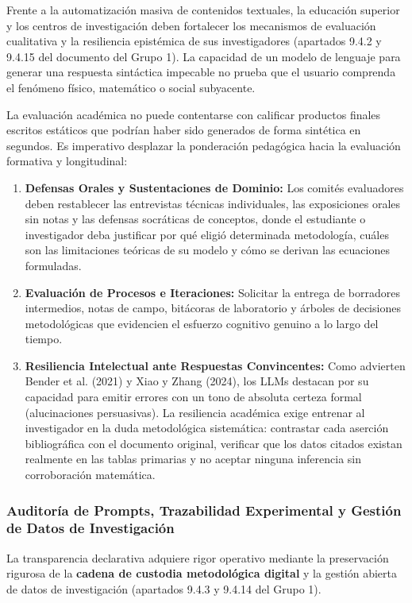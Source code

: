 Frente a la automatización masiva de contenidos textuales, la educación superior y los centros de investigación deben fortalecer los mecanismos de evaluación cualitativa y la resiliencia epistémica de sus investigadores (apartados 9.4.2 y 9.4.15 del documento del Grupo 1). La capacidad de un modelo de lenguaje para generar una respuesta sintáctica impecable no prueba que el usuario comprenda el fenómeno físico, matemático o social subyacente.

La evaluación académica no puede contentarse con calificar productos finales escritos estáticos que podrían haber sido generados de forma sintética en segundos. Es imperativo desplazar la ponderación pedagógica hacia la evaluación formativa y longitudinal:
\begin{enumerate}
    \item \textbf{Defensas Orales y Sustentaciones de Dominio:} Los comités evaluadores deben restablecer las entrevistas técnicas individuales, las exposiciones orales sin notas y las defensas socráticas de conceptos, donde el estudiante o investigador deba justificar por qué eligió determinada metodología, cuáles son las limitaciones teóricas de su modelo y cómo se derivan las ecuaciones formuladas.
    \item \textbf{Evaluación de Procesos e Iteraciones:} Solicitar la entrega de borradores intermedios, notas de campo, bitácoras de laboratorio y árboles de decisiones metodológicas que evidencien el esfuerzo cognitivo genuino a lo largo del tiempo.
    \item \textbf{Resiliencia Intelectual ante Respuestas Convincentes:} Como advierten Bender et al. (2021) y Xiao y Zhang (2024), los LLMs destacan por su capacidad para emitir errores con un tono de absoluta certeza formal (alucinaciones persuasivas). La resiliencia académica exige entrenar al investigador en la duda metodológica sistemática: contrastar cada aserción bibliográfica con el documento original, verificar que los datos citados existan realmente en las tablas primarias y no aceptar ninguna inferencia sin corroboración matemática.
\end{enumerate}

\subsubsection{Auditoría de Prompts, Trazabilidad Experimental y Gestión de Datos de Investigación}

La transparencia declarativa adquiere rigor operativo mediante la preservación rigurosa de la \textbf{cadena de custodia metodológica digital} y la gestión abierta de datos de investigación (apartados 9.4.3 y 9.4.14 del Grupo 1).

